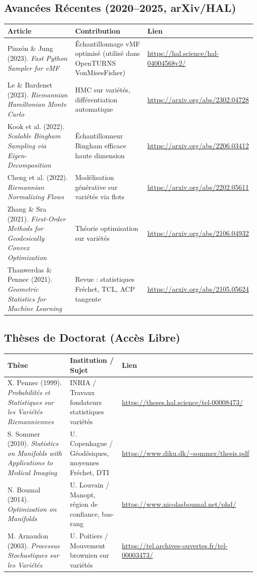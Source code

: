 \documentclass[11pt,a4paper]{article}
\begin{document}
\subsection{Avancées Récentes (2020--2025, arXiv/HAL)}
\begin{longtable}{@{}p{3.5cm}p{5.5cm}p{5cm}@{}}
\toprule
\textbf{Article} & \textbf{Contribution} & \textbf{Lien} \\
\midrule
Pinzón \& Jung (2023). \textit{Fast Python Sampler for vMF} & Échantillonnage vMF optimisé (utilisé dans OpenTURNS VonMisesFisher) & \url{https://hal.science/hal-04004568v2/} \\
Le \& Bardenet (2023). \textit{Riemannian Hamiltonian Monte Carlo} & HMC sur variétés, différentiation automatique & \url{https://arxiv.org/abs/2302.04728} \\
Kook et al. (2022). \textit{Scalable Bingham Sampling via Eigen-Decomposition} & Échantillonneur Bingham efficace haute dimension & \url{https://arxiv.org/abs/2206.03412} \\
Cheng et al. (2022). \textit{Riemannian Normalizing Flows} & Modélisation générative sur variétés via flots & \url{https://arxiv.org/abs/2202.05611} \\
Zhang \& Sra (2021). \textit{First-Order Methods for Geodesically Convex Optimization} & Théorie optimisation sur variétés & \url{https://arxiv.org/abs/2106.04932} \\
Thanwerdas \& Pennec (2021). \textit{Geometric Statistics for Machine Learning} & Revue : statistiques Fréchet, TCL, ACP tangente & \url{https://arxiv.org/abs/2105.05624} \\
\bottomrule
\end{longtable}

\subsection{Thèses de Doctorat (Accès Libre)}
\begin{longtable}{@{}p{3.5cm}p{5.5cm}p{5cm}@{}}
\toprule
\textbf{Thèse} & \textbf{Institution / Sujet} & \textbf{Lien} \\
\midrule
X. Pennec (1999). \textit{Probabilités et Statistiques sur les Variétés Riemanniennes} & INRIA / Travaux fondateurs statistiques variétés & \url{https://theses.hal.science/tel-00008473/} \\
S. Sommer (2010). \textit{Statistics on Manifolds with Applications to Medical Imaging} & U. Copenhague / Géodésiques, moyennes Fréchet, DTI & \url{https://www.diku.dk/~sommer/thesis.pdf} \\
N. Boumal (2014). \textit{Optimization on Manifolds} & U. Louvain / Manopt, région de confiance, bas-rang & \url{https://www.nicolasboumal.net/phd/} \\
M. Arnaudon (2003). \textit{Processus Stochastiques sur les Variétés} & U. Poitiers / Mouvement brownien sur variétés & \url{https://tel.archives-ouvertes.fr/tel-00003473/} \\
\bottomrule
\end{longtable}
\end{document}
